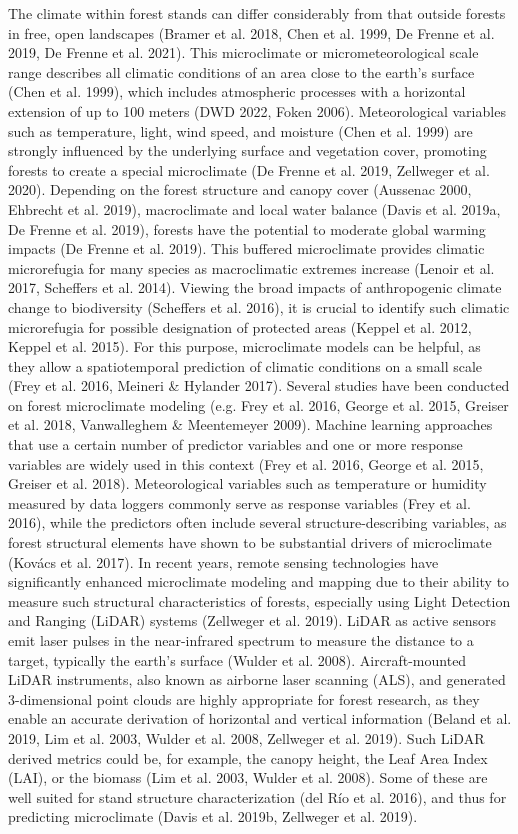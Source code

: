 \documentclass[5p]{elsarticle} %
\begin{document}
The climate within forest stands can differ considerably from that outside forests in free, open landscapes (Bramer et al. 2018, Chen et al. 1999, De Frenne et al. 2019, De Frenne et al. 2021). This microclimate or micrometeorological scale range describes all climatic conditions of an area close to the earth’s surface (Chen et al. 1999), which includes atmospheric processes with a horizontal extension of up to 100 meters (DWD 2022, Foken 2006). Meteorological variables such as temperature, light, wind speed, and moisture (Chen et al. 1999) are strongly influenced by the underlying surface and vegetation cover, promoting forests to create a special microclimate (De Frenne et al. 2019, Zellweger et al. 2020). Depending on the forest structure and canopy cover (Aussenac 2000, Ehbrecht et al. 2019), macroclimate and local water balance (Davis et al. 2019a, De Frenne et al. 2019), forests have the potential to moderate global warming impacts (De Frenne et al. 2019). This buffered microclimate provides climatic microrefugia for many species as macroclimatic extremes increase (Lenoir et al. 2017, Scheffers et al. 2014). Viewing the broad impacts of anthropogenic climate change to biodiversity (Scheffers et al. 2016), it is crucial to identify such climatic microrefugia for possible designation of protected areas (Keppel et al. 2012, Keppel et al. 2015). For this purpose, microclimate models can be helpful, as they allow a spatiotemporal prediction of climatic conditions on a small scale (Frey et al. 2016, Meineri \& Hylander 2017).
Several studies have been conducted on forest microclimate modeling (e.g. Frey et al. 2016, George et al. 2015, Greiser et al. 2018, Vanwalleghem \& Meentemeyer 2009). Machine learning approaches that use a certain number of predictor variables and one or more response variables are widely used in this context (Frey et al. 2016, George et al. 2015, Greiser et al. 2018). Meteorological variables such as temperature or humidity measured by data loggers commonly serve as response variables (Frey et al. 2016), while the predictors often include several structure-describing variables, as forest structural elements have shown to be substantial drivers of microclimate (Kovács et al. 2017). In recent years, remote sensing technologies have significantly enhanced microclimate modeling and mapping due to their ability to measure such structural characteristics of forests, especially using Light Detection and Ranging (LiDAR) systems (Zellweger et al. 2019). LiDAR as active sensors emit laser pulses in the near-infrared spectrum to measure the distance to a target, typically the earth’s surface (Wulder et al. 2008). Aircraft-mounted LiDAR instruments, also known as airborne laser scanning (ALS), and generated 3-dimensional point clouds are highly appropriate for forest research, as they enable an accurate derivation of horizontal and vertical information (Beland et al. 2019, Lim et al. 2003, Wulder et al. 2008, Zellweger et al. 2019). Such LiDAR derived metrics could be, for example, the canopy height, the Leaf Area Index (LAI), or the biomass (Lim et al. 2003, Wulder et al. 2008). Some of these are well suited for stand structure characterization (del Río et al. 2016), and thus for predicting microclimate (Davis et al. 2019b, Zellweger et al. 2019).
\end{document}
